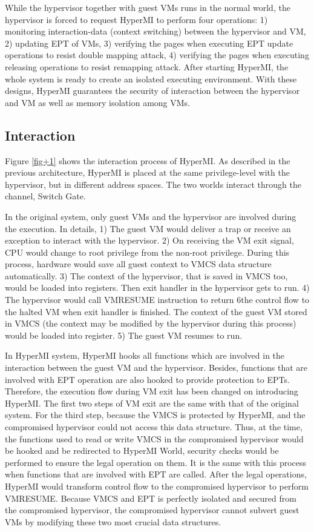 \documentclass[conference]{IEEEtran}
\begin{document}
While the hypervisor together with guest VMs runs in the normal world, the hypervisor is forced to request HyperMI to perform four operations: 1) monitoring interaction-data (context switching) between the hypervisor and VM, 2) updating EPT of VMs, 3) verifying the pages when executing EPT update operations to resist double mapping attack, 4) verifying the pages when executing releasing operations to resist remapping attack. After starting HyperMI, the whole system is ready to create an isolated executing environment. With these designs, HyperMI guarantees the security of interaction between the hypervisor and VM as well as memory isolation among VMs.


\iffalse
\subsection{Interaction} \label{IN}


Figure \ref{fig+1} shows the interaction process of HyperMI. 
As described in the previous architecture, HyperMI is placed at the same privilege-level with the hypervisor, but in different address spaces. The two worlds interact through the channel, Switch Gate.


In the original system, only guest VMs and the hypervisor are involved during the execution. In details, 1) The guest VM would deliver a trap or receive an exception to interact with the hypervisor. 2) On receiving the VM exit signal, CPU would change to root privilege from the non-root privilege. During this process, hardware would save all guest context to VMCS data structure automatically. 3) The context of the hypervisor, that is saved in VMCS too, would be loaded into registers. Then exit handler in the hypervisor gets to run. 4) The hypervisor would call VMRESUME instruction to return 6the control flow to the halted VM when exit handler is finished. The context of the guest VM stored in VMCS (the context may be modified by the hypervisor during this process) would be loaded into register. 5) The guest VM resumes to run.

In HyperMI system, HyperMI hooks all functions which are involved in the interaction between the guest VM and the hypervisor. Besides, functions that are involved with EPT operation are also hooked to provide protection to EPTs. Therefore, the execution flow during VM exit has been changed on introducing HyperMI. The first two steps of VM exit are the same with that of the original system. For the third step, because the VMCS is protected by HyperMI, and the compromised hypervisor could not access this data structure. Thus, at the time, the functions used to read or write VMCS in the compromised hypervisor would be hooked and be redirected to HyperMI World, security checks would be performed to ensure the legal operation on them. It is the same with this process when functions that are involved with EPT are called. 
After the legal operations, HyperMI would transform control flow to the compromised hypervisor to perform VMRESUME. Because VMCS and EPT is perfectly isolated and secured from the compromised hypervisor, the compromised hypervisor cannot subvert guest VMs by modifying these two most crucial data structures.
\end{document}
